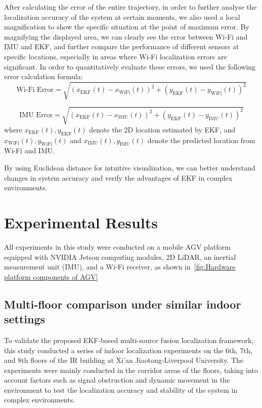 \documentclass[12pt,a4paper]{article}
\numberwithin{equation}{section}
\begin{document}
After calculating the error of the entire trajectory, in order to further
analyse the localization accuracy of the system at certain moments, we also used
a local magnification to show the specific situation at the point of maximum
error. By magnifying the displayed area, we can clearly see the error between
Wi-Fi and IMU and EKF, and further compare the performance of different sensors
at specific locations, especially in areas where Wi-Fi localization errors are
significant. In order to quantitatively evaluate these errors, we used the
following error calculation formula:
\begin{equation}
  \text{Wi-Fi Error} = \sqrt{(x_{\text{EKF}}(t) - x_{\text{WiFi}}(t))^2 + (y_{\text{EKF}}(t) - y_{\text{WiFi}}(t))^2}
\end{equation}

\begin{equation}
  \text{IMU Error} = \sqrt{(x_{\text{EKF}}(t) - x_{\text{IMU}}(t))^2 + (y_{\text{EKF}}(t) - y_{\text{IMU}}(t))^2}
\end{equation}
where \( x_{\text{EKF}}(t), y_{\text{EKF}}(t) \) denote the 2D location
estimated by EKF, and \( x_{\text{WiFi}}(t), y_{\text{WiFi}}(t) \) and \(
x_{\text{IMU}}(t), y_{\text{IMU}}(t) \) denote the predicted location from Wi-Fi
and IMU.

By using Euclidean distance for intuitive visualization, we can better
understand changes in system accuracy and verify the advantages of EKF in
complex environments.


\newpage
\section{Experimental Results}
All experiments in this study were conducted on a mobile AGV platform equipped
with NVIDIA Jetson computing modules, 2D LiDAR, an inertial measurement unit
(IMU), and a Wi-Fi receiver, as shown in~\autoref{fig:Hardware platform
  components of AGV}

\subsection{Multi-floor comparison under similar indoor settings}
To validate the proposed EKF-based multi-source fusion localization framework,
this study conducted a series of indoor localization experiments on the 6th,
7th, and 8th floors of the IR building at Xi'an Jiaotong-Liverpool
University. The experiments were mainly conducted in the corridor areas of the
floors, taking into account factors such as signal obstruction and dynamic
movement in the environment to test the localization accuracy and stability of
the system in complex environments.
\end{document}
